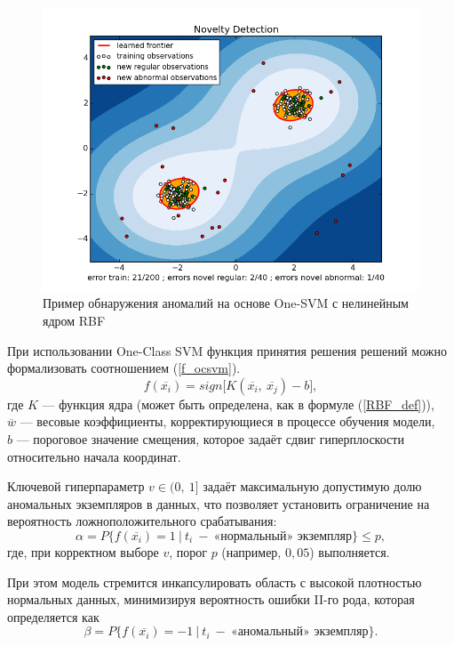 \begin{figure}
  \centering
  \includegraphics[scale=0.3]{inc/images/rbf-demo.png}
  \caption{Пример обнаружения аномалий на основе One-SVM с нелинейным ядром RBF \cite{Skilear-RBF-Doc}}
  \label{fig:rbf-demo}
\end{figure}

При использовании One-Class SVM функция принятия решения решений можно формализовать соотношением (\ref{f_ocsvm}).
\begin{equation}\label{f_ocsvm}
    f(\overline{x_i}) = sign\Big[K(\overline{x_i},\ \overline{x_j}) - b\Big],
\end{equation}
где $K$ --- функция ядра (может быть определена, как в формуле (\ref{RBF_def})), \\
$\overline{w}$ --- весовые коэффициенты, корректирующиеся в процессе обучения модели, \\
$b$ --- пороговое значение смещения, которое задаёт сдвиг гиперплоскости относительно начала координат.

Ключевой гиперпараметр $v \in (0,\ 1]$ задаёт максимальную допустимую долю аномальных экземпляров в данных, что позволяет установить ограничение на вероятность ложноположительного срабатывания:
\begin{equation}\label{alpha_ocsvm}
    \alpha = P\Big\{ f(\overline{x_i}) = 1\ \Big|\ t_i\ -\ \text{«нормальный» экземпляр} \Big\} \leq p,
\end{equation}
где, при корректном выборе $v$, порог $p$ (например, $0,05$) выполняется.

При этом модель стремится инкапсулировать область с высокой плотностью нормальных данных, минимизируя вероятность ошибки II-го рода, которая определяется как
\begin{equation}\label{beta_ocsvm}
    \beta = P\Big\{ f(\overline{x_i}) = -1\ \Big|\ t_i\ -\ \text{«аномальный» экземпляр} \Big\}.
\end{equation}

